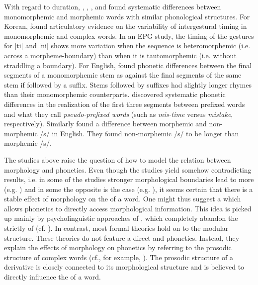 With regard to duration, \cite{Cho.2001}, \cite{Sugahara.2009}, \cite{Hanique.2011}, \cite{Smith.2012} and \cite{Plag.2017} found systematic differences between monomorphemic and morphemic words with similar phonological structures. For Korean, \cite{Cho.2001} found articulatory evidence on the variability of intergestural timing in monomorphemic and complex words. In an EPG study, the timing of the gestures for [ti] and [ni] shows more variation when the sequence is heteromorphemic (i.e. across a morpheme-boundary) than when it is tautomorphemic (i.e. without straddling a boundary).
For English, \citet{Sugahara.2009} found phonetic differences between the final segments of a monomorphemic stem as against the final segments of the same stem if followed by a suffix. Stems followed by  suffixes had slightly longer rhymes than their monomorphemic counterparts. \citet{Smith.2012} discovered systematic phonetic differences in the realization of the first three segments between prefixed words and what they call \textit{pseudo-prefixed words} (such as \textit{mis-time} versus \textit{mistake}, respectively). Similarly \cite{Plag.2017} found a difference between morphemic and non-morphemic /s/ in English. They found non-morphemic /s/ to be longer than morphemic /s/. 


The studies above raise the question of how to model the relation between morphology and phonetics. Even though the studies yield somehow contradicting results, i.e. in some of the studies stronger morphological boundaries lead to more  (e.g. \citealt{Sugahara.2009, Smith.2012}) and in some the opposite is the case (e.g. \citealt{Schuppler.2012, Plag.2017}), it seems certain that there is a stable effect of morphology on the  of a word. One might thus suggest a  which allows phonetics to directly access morphological information. This idea is picked up mainly by psycholinguistic approaches of , which completely abandon the strictly  of  (cf. ). 
In contrast, most formal theories hold on to the modular structure. These theories do not feature a direct  and phonetics. Instead, they explain the effects of morphology on phonetics by referring to the prosodic structure of complex words (cf., for example, \citealt{Booij.1983b,Sproat.1993,Nespor.2007,Sugahara.2009,Bergmann.}). The prosodic structure of a derivative is closely connected to its morphological structure and is believed to directly influence the  of a word. 



